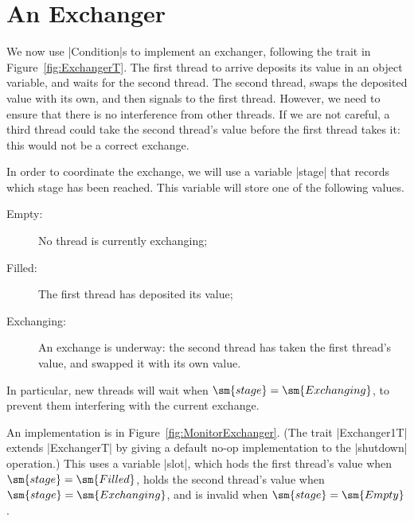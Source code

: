\section{An Exchanger}

We now use |Condition|s to implement an exchanger, following the trait in
Figure~\ref{fig:ExchangerT}.  The first thread to arrive deposits its value in
an object variable, and waits for the second thread.  The second thread, swaps
the deposited value with its own, and then signals to the first thread.
However, we need to ensure that there is no interference from other threads.
If we are not careful, a third thread could take the second thread's value
before the first thread takes it: this would not be a correct exchange.

In order to coordinate the exchange, we will use a variable |stage| that
records which stage has been reached.  This variable will store one of the
following values.
%
\begin{description}
\item[{\scalastyle Empty}:] No thread is currently exchanging;

\item[{\scalashape Filled}:] The first thread has deposited its value;

\item[{\scalashape Exchanging}:] An exchange is underway: the second thread
  has taken the first thread's value, and swapped it with its own value.
\end{description}
%
In particular, new threads will wait when $\sm{stage} = \sm{Exchanging}$, to
prevent them interfering with the current exchange.

An implementation is in Figure~\ref{fig:MonitorExchanger}.  (The trait
|Exchanger1T| extends |ExchangerT| by giving a default no-op implementation to
the |shutdown| operation.)  This uses a variable |slot|, which hods the first
thread's value when $\sm{stage} = \sm{Filled}$, holds the second thread's
value when $\sm{stage} = \sm{Exchanging}$, and is invalid when $\sm{stage} =
\sm{Empty}$. 



